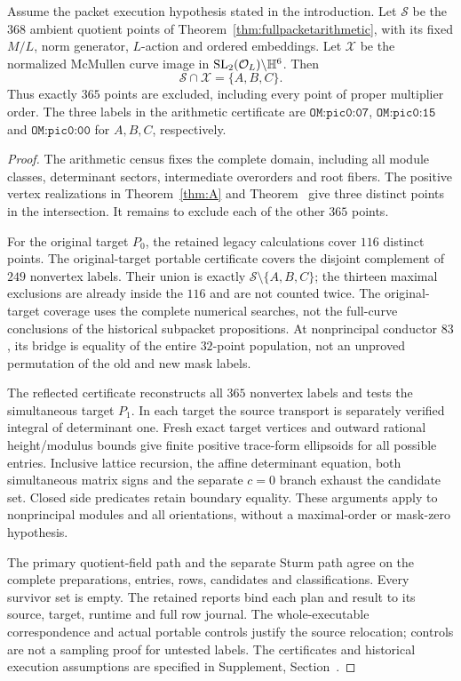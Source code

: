 \begin{theorem}\label{thm:fullpacketgeometry}
Assume the packet execution hypothesis stated in the introduction.
Let $\mathcal S$ be the $368$ ambient quotient points of
Theorem~\ref{thm:fullpacketarithmetic}, with its fixed $M/L$, norm
generator, $L$-action and ordered embeddings. Let $\mathcal X$ be the
normalized McMullen curve image in $\operatorname{SL}_2(\mathcal O_L)\backslash\mathbb H^6$.
Then
\[
 \mathcal S\cap\mathcal X=\{A,B,C\}.
\]
Thus exactly $365$ points are excluded, including every point of proper
multiplier order. The three labels in the arithmetic certificate are
$\texttt{OM:pic0:07}$, $\texttt{OM:pic0:15}$ and
$\texttt{OM:pic0:00}$ for $A,B,C$, respectively.
\end{theorem}
\begin{proof}
The arithmetic census fixes the complete domain, including all module
classes, determinant sectors, intermediate overorders and root fibers.
The positive vertex realizations in Theorem~\ref{thm:A} and
Theorem~ give three distinct points in the intersection.
It remains to exclude each of the other $365$ points.

For the original target $P_0$, the retained legacy calculations cover
$116$ distinct points. The original-target portable certificate covers
the disjoint complement of $249$ nonvertex labels. Their union is exactly
$\mathcal S\setminus\{A,B,C\}$; the thirteen maximal exclusions are already
inside the $116$ and are not counted twice. The original-target coverage
uses the complete numerical searches, not the full-curve conclusions
of the historical subpacket propositions. At nonprincipal conductor
$83$, its bridge is equality of the entire $32$-point population, not
an unproved permutation of the old and new mask labels.

The reflected certificate reconstructs all $365$ nonvertex labels and
tests the simultaneous target $P_1$. In each target the source transport
is separately verified integral of determinant one. Fresh exact target
vertices and outward rational height/modulus bounds give finite
positive trace-form ellipsoids for all possible entries. Inclusive
lattice recursion, the affine determinant equation, both simultaneous
matrix signs and the separate $c=0$ branch exhaust the candidate set.
Closed side predicates retain boundary equality. These arguments apply
to nonprincipal modules and all orientations, without a maximal-order
or mask-zero hypothesis.

The primary quotient-field path and the separate Sturm path agree on
the complete preparations, entries, rows, candidates and classifications.
Every survivor set is empty. The retained reports bind each plan and
result to its source, target, runtime and full row journal. The
whole-executable correspondence and actual portable controls justify
the source relocation; controls are not a sampling proof for untested
labels. The certificates and historical execution assumptions are
specified in Supplement, Section~.


\end{proof}
